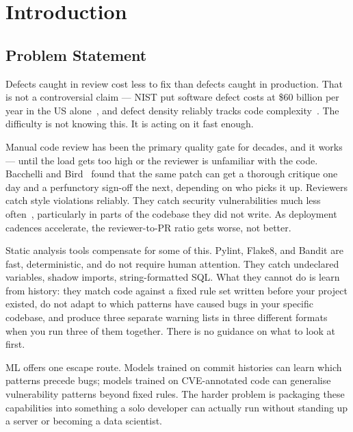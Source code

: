 \documentclass[12pt, oneside]{report}
\begin{document}
\clearpage
{}
\setcounter{page}{1}
\chapter{Introduction}
\label{ch:intro}

\section{Problem Statement}
\label{sec:problem}

Defects caught in review cost less to fix than defects caught in production. That is not a controversial claim — NIST put software defect costs at \$60 billion per year in the US alone~\cite{nist2002}, and defect density reliably tracks code complexity~\cite{mccabe1976}. The difficulty is not knowing this. It is acting on it fast enough.

Manual code review has been the primary quality gate for decades, and it works — until the load gets too high or the reviewer is unfamiliar with the code. Bacchelli and Bird~\cite{bacchelli2013} found that the same patch can get a thorough critique one day and a perfunctory sign-off the next, depending on who picks it up. Reviewers catch style violations reliably. They catch security vulnerabilities much less often~\cite{fagan1976}, particularly in parts of the codebase they did not write. As deployment cadences accelerate, the reviewer-to-PR ratio gets worse, not better.

Static analysis tools compensate for some of this. Pylint, Flake8, and Bandit are fast, deterministic, and do not require human attention. They catch undeclared variables, shadow imports, string-formatted SQL. What they cannot do is learn from history: they match code against a fixed rule set written before your project existed, do not adapt to which patterns have caused bugs in your specific codebase, and produce three separate warning lists in three different formats when you run three of them together. There is no guidance on what to look at first.

ML offers one escape route. Models trained on commit histories can learn which patterns precede bugs; models trained on CVE-annotated code can generalise vulnerability patterns beyond fixed rules. The harder problem is packaging these capabilities into something a solo developer can actually run without standing up a server or becoming a data scientist.
\end{document}
